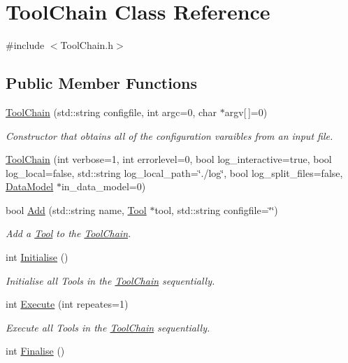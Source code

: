 \hypertarget{classToolChain}{\section{Tool\-Chain Class Reference}
\label{classToolChain}
}


{\ttfamily \#include $<$Tool\-Chain.\-h$>$}

\subsection*{Public Member Functions}
\begin{DoxyCompactItemize}
\item 
\hyperlink{classToolChain_a133e224899a743ee4a679396f8569bf9}{Tool\-Chain} (std\-::string configfile, int argc=0, char $\ast$argv\mbox{[}$\,$\mbox{]}=0)
\begin{DoxyCompactList}\small\item\em Constructor that obtains all of the configuration varaibles from an input file. \end{DoxyCompactList}\item 
\hyperlink{classToolChain_adefb544d73c43c2621f3ccb14ad93dc7}{Tool\-Chain} (int verbose=1, int errorlevel=0, bool log\-\_\-interactive=true, bool log\-\_\-local=false, std\-::string log\-\_\-local\-\_\-path=\char`\"{}./log\char`\"{}, bool log\-\_\-split\-\_\-files=false, \hyperlink{classDataModel}{Data\-Model} $\ast$in\-\_\-data\-\_\-model=0)
\item 
bool \hyperlink{classToolChain_ae6859092e14be1f9538c50d7c838fe8e}{Add} (std\-::string name, \hyperlink{classTool}{Tool} $\ast$tool, std\-::string configfile=\char`\"{}\char`\"{})
\begin{DoxyCompactList}\small\item\em Add a \hyperlink{classTool}{Tool} to the \hyperlink{classToolChain}{Tool\-Chain}. \end{DoxyCompactList}\item 
\hypertarget{classToolChain_a341f343926341b82a29c586a7b9683af}{int \hyperlink{classToolChain_a341f343926341b82a29c586a7b9683af}{Initialise} ()}\label{classToolChain_a341f343926341b82a29c586a7b9683af}

\begin{DoxyCompactList}\small\item\em Initialise all Tools in the \hyperlink{classToolChain}{Tool\-Chain} sequentially. \end{DoxyCompactList}\item 
int \hyperlink{classToolChain_a303e299293fd4d3a5e91865e04898e52}{Execute} (int repeates=1)
\begin{DoxyCompactList}\small\item\em Execute all Tools in the \hyperlink{classToolChain}{Tool\-Chain} sequentially. \end{DoxyCompactList}\item 
\hypertarget{classToolChain_a3828756135773fb9ca4b361a47296dd9}{int \hyperlink{classToolChain_a3828756135773fb9ca4b361a47296dd9}{Finalise} ()}\label{classToolChain_a3828756135773fb9ca4b361a47296dd9}


\end{DoxyCompactItemize}
